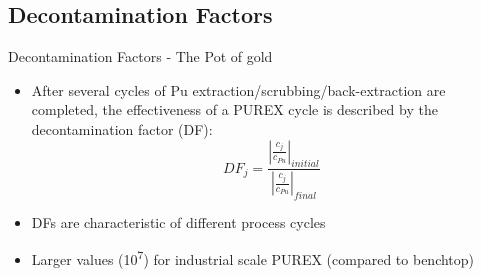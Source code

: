 \documentclass{beamer}
\newcommand{\tss}{\textsuperscript}
\begin{document}
\subsection{Decontamination Factors}
\begin{frame}{Decontamination Factors - The Pot of gold}
  \begin{itemize}
  \item{After several cycles of Pu extraction/scrubbing/back-extraction
    are completed, the effectiveness of a PUREX cycle is described
    by the decontamination factor (DF):}
    \begin{equation*}
      DF_j=\frac{\left|\frac{c_j}{c_{Pu}}\right|_{initial}}
      {\left|\frac{c_j}{c_{Pu}}\right|_{final}}
    \end{equation*}
  \item{DFs are characteristic of different process cycles}
  \item{Larger values (10\tss{7}) for industrial scale PUREX (compared
  to benchtop)\tss{\cite{stoller1961reactor,benedict1982nuclear}}}
  \end{itemize}
\end{frame}
\end{document}
